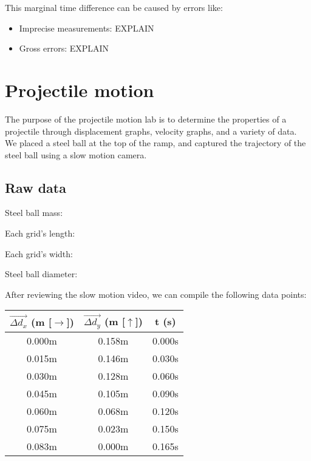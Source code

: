 \documentclass[a4paper,12pt]{article}
\begin{document}
	This marginal time difference can be caused by errors like:
	\begin{itemize}
		\item Imprecise measurements: EXPLAIN
		\item Gross errors: EXPLAIN
	\end{itemize}
	
	\newpage
	
	\section{Projectile motion}
	The purpose of the projectile motion lab is to determine the properties of a projectile through displacement graphs, velocity graphs, and a variety of data. We placed a steel ball at the top of the ramp, and captured the trajectory of the steel ball using a slow motion camera.
	
	\subsection{Raw data}
	Steel ball mass:
	
	Each grid's length: 
	
	Each grid's width:
	
	Steel ball diameter:
	
	After reviewing the slow motion video, we can compile the following data points:
	\begin{center}
		\begin{tabular}{ |c|c|c| } 
			\hline
			$\vec{\Delta d_x}$ (m [$\rightarrow$]) & $\vec{\Delta d_y}$ (m [$\uparrow$]) & t (s)\\ 
			\hline\hline
			0.000m & 0.158m & 0.000s\\
			\hline 
			0.015m & 0.146m & 0.030s\\ 
			\hline
			0.030m & 0.128m & 0.060s\\
			\hline
			0.045m & 0.105m & 0.090s \\
			\hline
			0.060m & 0.068m & 0.120s\\
			\hline
			0.075m & 0.023m & 0.150s \\
			\hline
			0.083m & 0.000m & 0.165s\\
			\hline
		\end{tabular} 
	\end{center}
	\bigskip
	
\end{document}
